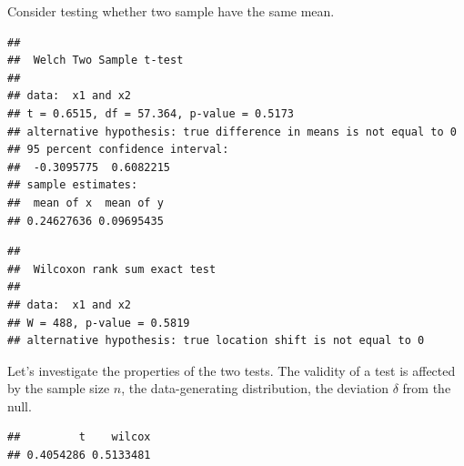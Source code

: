 Consider testing whether two sample have the same mean.

\begin{knitrout}
\color{fgcolor}\begin{kframe}
\begin{alltt}
\hlstd{(}\hlstd{)}
 \hlkwb{<-} 
 \hlkwb{<-}  \hlkwb{<-}  \hlkwb{<-} 
 \hlkwb{<-} 
 \hlkwb{<-}  \hlopt{+} 
\end{alltt}
\begin{verbatim}
## 
## 	Welch Two Sample t-test
## 
## data:  x1 and x2
## t = 0.6515, df = 57.364, p-value = 0.5173
## alternative hypothesis: true difference in means is not equal to 0
## 95 percent confidence interval:
##  -0.3095775  0.6082215
## sample estimates:
##  mean of x  mean of y 
## 0.24627636 0.09695435
\end{verbatim}
\begin{alltt}
 
\end{alltt}
\begin{verbatim}
## 
## 	Wilcoxon rank sum exact test
## 
## data:  x1 and x2
## W = 488, p-value = 0.5819
## alternative hypothesis: true location shift is not equal to 0
\end{verbatim}
\end{kframe}
\end{knitrout}

Let's investigate the properties of the two tests. The validity of a
test is affected by the sample size $n$, the data-generating
distribution, the deviation $\delta$ from the null.
\begin{knitrout}
\color{fgcolor}\begin{kframe}
\begin{alltt}
 \hlkwb{<-} \hlstd{(}\hlstd{,} \hlstd{,}  \hlstd{=} \hlstd{) \{}
     \hlkwb{<-} 
     \hlkwb{<-}  \hlopt{+} 
     \hlkwb{<-} \hlopt{$}
     \hlkwb{<-} \hlopt{$}
    \hlstd{(}  
\hlstd{\}}

\hlstd{(} \hlstd{)}
\end{alltt}
\begin{verbatim}
##         t    wilcox 
## 0.4054286 0.5133481
\end{verbatim}
\end{kframe}
\end{knitrout}

